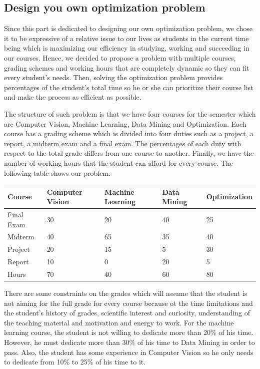 \subsection{Design you own optimization problem}
Since this part is dedicated to designing our own optimization problem, we chose it to be expressive of a relative issue to our lives as students in the current time being which is maximizing our efficiency in studying, working and succeeding in our courses. Hence, we decided to propose a problem with multiple courses, grading schemes and working hours that are completely dynamic so they can fit every student's needs. Then, solving the optimization problem provides percentages of the student's total time so he or she can prioritize their course list and make the process as efficient as possible. 

The structure of such problem is that we have four courses for the semester which are Computer Vision, Machine Learning, Data Mining and Optimization. Each course has a grading scheme which is divided into four duties such as a project, a report, a midterm exam and a final exam. The percentages of each duty with respect to the total grade differs from one course to another. Finally, we have the number of working hours that the student can afford for every course. The following table shows our problem.
\begin{center}
	\begin{tabu} to 0.95\textwidth { |X[c]|X[c]X[c]X[c]X[c]| }
		\hline
		Course & Computer Vision & Machine Learning & Data Mining & Optimization \\
		\hline
		Final Exam & 30 & 20 & 40 & 25 \\
		Midterm & 40 & 65 & 35 & 40 \\
		Project & 20 & 15 & 5 & 30 \\
		Report & 10 & 0 & 20 & 5 \\
		\hline
		Hours & 70 & 40 & 60 & 80 \\
		\hline
	\end{tabu}
\end{center}
There are some constraints on the grades which will assume that the student is not aiming for the full grade for every course because ot the time limitations and the student's history of grades, scientific interest and curiosity, understanding of the teaching material and motivation and energy to work. For the machine learning course, the student is not willing to dedicate more than 20\% of his time. However, he must dedicate more than 30\% of his time to Data Mining in order to pass. Also, the student has some experience in Computer Vision so he only needs to dedicate from 10\% to 25\% of his time to it. \\
